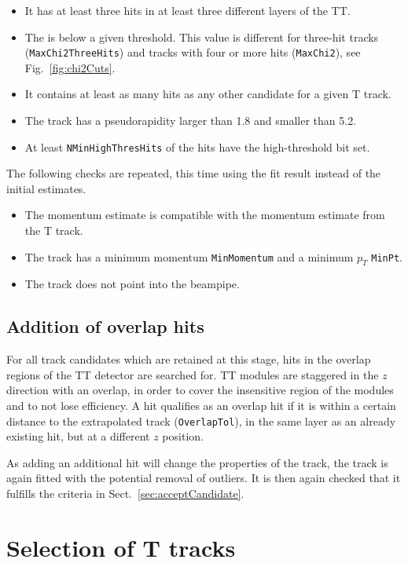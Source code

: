 \begin{itemize}
\item It has at least three hits in at least three different layers of the TT.
\item The \chisqndf is below a given threshold. This value is different for
three-hit tracks (\texttt{MaxChi2ThreeHits}) and tracks with four or more hits (\texttt{MaxChi2}),
see Fig.~\ref{fig:chi2Cuts}. 
\item It contains at least as many hits as any other candidate for a given T track.
\item The track has a pseudorapidity larger than 1.8 and smaller than 5.2.
\item At least \texttt{NMinHighThresHits} of the hits have the high-threshold
bit set.
\end{itemize}

The following checks are repeated, this time using the fit result instead of the initial estimates.

\begin{itemize}
\item The momentum estimate is compatible with the momentum estimate from the
T track.
\item The track has a minimum momentum \texttt{MinMomentum} and a minimum $p_{T}$ \texttt{MinPt}.
\item The track does not point into the beampipe.
\end{itemize}

\subsection{Addition of overlap hits}
\label{sec:addOverlap}
For all track candidates which are retained at this stage, hits in the overlap
regions of the TT detector are searched for. 
TT modules are staggered in the $z$ direction with an overlap, in order to cover the insensitive region of the modules and to not lose efficiency. A hit qualifies as an overlap hit if it
is within a certain distance to the extrapolated track (\texttt{OverlapTol}), in the same
layer as an already existing hit, but at a
different $z$ position.

As adding an additional hit will change the properties of the track, the track
is again fitted with the potential removal of outliers. It is then again checked
that it fulfills the criteria in Sect.~\ref{sec:acceptCandidate}.


\section{Selection of T tracks }
\label{sec:TSeed}

